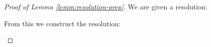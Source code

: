 \begin{proof}[Proof of Lemma \ref{lemm:resolution-prep}]
  We are given a resolution:
  \begin{center}
  \end{center}
  From this we construct the resolution:
  \begin{center}
  \end{center}


\end{proof}
